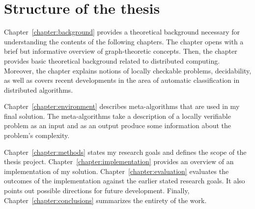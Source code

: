 \section{Structure of the thesis}
\label{section:structure} 

Chapter~\ref{chapter:background} provides a theoretical
background necessary for understanding the contents of the
following chapters. The chapter opens with
a brief but informative overview of graph-theoretic
concepts. Then, the chapter provides basic
theoretical background related to distributed computing.
Moreover, the chapter explains notions of
locally checkable problems, decidability, as well as
covers recent developments in the area of
automatic classification in distributed algorithms.

Chapter~\ref{chapter:environment} describes
meta-algorithms that are used in my final
solution. The meta-algorithms take a description
of a locally verifiable problem as an input and
as an output produce some information about the
problem's complexity.

Chapter~\ref{chapter:methods} states my research goals
and defines the scope of the thesis project.
Chapter~\ref{chapter:implementation}
provides an overview of an implementation of
my solution. Chapter~\ref{chapter:evaluation}
evaluates the outcomes of the implementation
against the earlier stated research goals. It
also points out possible directions for
future development. Finally, Chapter~\ref{chapter:conclusions}
summarizes the entirety of the work.
